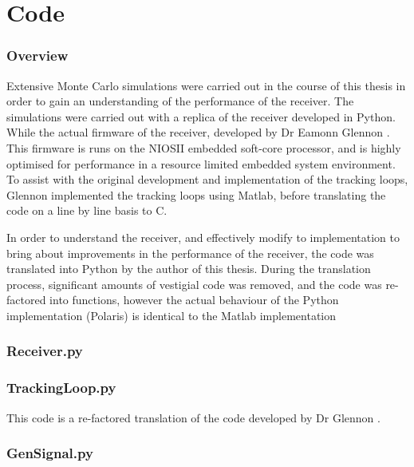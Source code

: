 \label{ch:Code}
\chapter{Code}

\subsection{Overview}

Extensive Monte Carlo simulations were carried out in the course of this thesis in order to gain an understanding of the performance of the receiver.  The simulations were carried out with a replica of the receiver developed in Python. While the actual firmware of the receiver, developed by Dr Eamonn Glennon \cite{Glennon11aquariusfirmware} \cite{FirmwareCode}. This firmware is runs on the NIOSII embedded soft-core processor, and is highly optimised for performance in a resource limited embedded system environment. To assist with the original development and implementation of the tracking loops, Glennon implemented the tracking loops using Matlab\cite{MatlabCode}, before translating the code on a line by line basis to C. 

In order to understand the receiver, and effectively modify to implementation to bring about improvements in the performance of the receiver, the code was translated into Python by the author of this thesis. During the translation process, significant amounts of vestigial code was removed, and the code was re-factored into functions, however the actual behaviour of the Python implementation (Polaris) is identical to the Matlab implementation


\subsection{Receiver.py}


\subsection{TrackingLoop.py}
This code is a re-factored translation of the code developed by Dr Glennon \cite{MatlabCode}.


\subsection{GenSignal.py}



